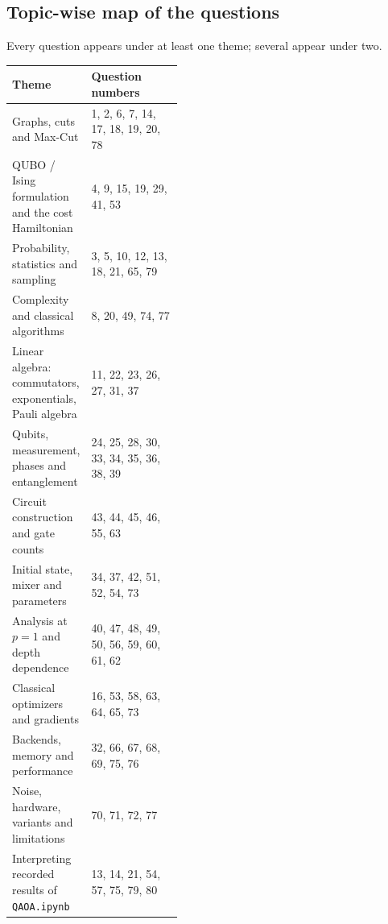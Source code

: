 \documentclass[11pt,a4paper]{article}
\begin{document}
\subsection*{Topic-wise map of the questions}\label{topicmap}
{\small Every question appears under at least one theme; several appear under two.\par}
{\small\renewcommand{\arraystretch}{1.2}
\begin{tabularx}{\linewidth}{@{}>{\raggedright\arraybackslash}p{0.42\linewidth}L@{}}
\toprule
\textbf{Theme} & \textbf{Question numbers}\\ \midrule
Graphs, cuts and Max-Cut & 1, 2, 6, 7, 14, 17, 18, 19, 20, 78 \\
QUBO / Ising formulation and the cost Hamiltonian & 4, 9, 15, 19, 29, 41, 53 \\
Probability, statistics and sampling & 3, 5, 10, 12, 13, 18, 21, 65, 79 \\
Complexity and classical algorithms & 8, 20, 49, 74, 77 \\
Linear algebra: commutators, exponentials, Pauli algebra & 11, 22, 23, 26, 27, 31, 37 \\
Qubits, measurement, phases and entanglement & 24, 25, 28, 30, 33, 34, 35, 36, 38, 39 \\
Circuit construction and gate counts & 43, 44, 45, 46, 55, 63 \\
Initial state, mixer and parameters & 34, 37, 42, 51, 52, 54, 73 \\
Analysis at $p = 1$ and depth dependence & 40, 47, 48, 49, 50, 56, 59, 60, 61, 62 \\
Classical optimizers and gradients & 16, 53, 58, 63, 64, 65, 73 \\
Backends, memory and performance & 32, 66, 67, 68, 69, 75, 76 \\
Noise, hardware, variants and limitations & 70, 71, 72, 77 \\
Interpreting recorded results of \texttt{QAOA.ipynb} & 13, 14, 21, 54, 57, 75, 79, 80 \\
\bottomrule
\end{tabularx}}
\end{document}
